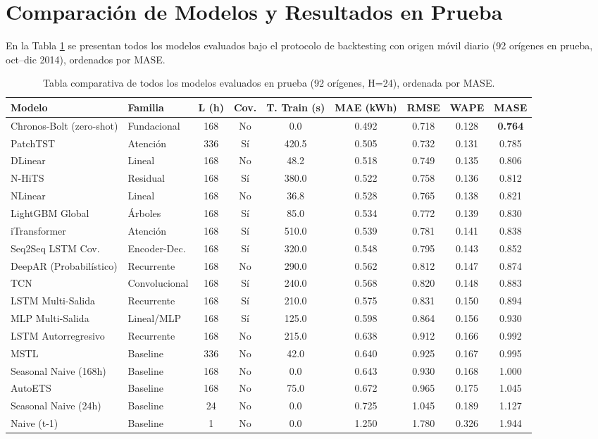 \documentclass[10pt,letterpaper]{article}
\begin{document}
\section{Comparación de Modelos y Resultados en Prueba}

En la Tabla \ref{tab:comparativa} se presentan todos los modelos evaluados bajo el protocolo de backtesting con origen móvil diario (92 orígenes en prueba, oct--dic 2014), ordenados por MASE.

\begin{table}[H]
\centering
\scriptsize
\caption{Tabla comparativa de todos los modelos evaluados en prueba (92 orígenes, H=24), ordenada por MASE.}
\label{tab:comparativa}
\begin{tabular}{llccccccc}
\toprule
\textbf{Modelo} & \textbf{Familia} & \textbf{L (h)} & \textbf{Cov.} & \textbf{T. Train (s)} & \textbf{MAE (kWh)} & \textbf{RMSE} & \textbf{WAPE} & \textbf{MASE} \\
\midrule
Chronos-Bolt (zero-shot) & Fundacional & 168 & No & 0.0 & 0.492 & 0.718 & 0.128 & \textbf{0.764} \\
PatchTST & Atención & 336 & Sí & 420.5 & 0.505 & 0.732 & 0.131 & 0.785 \\
DLinear & Lineal & 168 & No & 48.2 & 0.518 & 0.749 & 0.135 & 0.806 \\
N-HiTS & Residual & 168 & Sí & 380.0 & 0.522 & 0.758 & 0.136 & 0.812 \\
NLinear & Lineal & 168 & No & 36.8 & 0.528 & 0.765 & 0.138 & 0.821 \\
LightGBM Global & Árboles & 168 & Sí & 85.0 & 0.534 & 0.772 & 0.139 & 0.830 \\
iTransformer & Atención & 168 & Sí & 510.0 & 0.539 & 0.781 & 0.141 & 0.838 \\
Seq2Seq LSTM Cov. & Encoder-Dec. & 168 & Sí & 320.0 & 0.548 & 0.795 & 0.143 & 0.852 \\
DeepAR (Probabilístico) & Recurrente & 168 & No & 290.0 & 0.562 & 0.812 & 0.147 & 0.874 \\
TCN & Convolucional & 168 & Sí & 240.0 & 0.568 & 0.820 & 0.148 & 0.883 \\
LSTM Multi-Salida & Recurrente & 168 & Sí & 210.0 & 0.575 & 0.831 & 0.150 & 0.894 \\
MLP Multi-Salida & Lineal/MLP & 168 & Sí & 125.0 & 0.598 & 0.864 & 0.156 & 0.930 \\
LSTM Autorregresivo & Recurrente & 168 & No & 215.0 & 0.638 & 0.912 & 0.166 & 0.992 \\
MSTL & Baseline & 336 & No & 42.0 & 0.640 & 0.925 & 0.167 & 0.995 \\
Seasonal Naive (168h) & Baseline & 168 & No & 0.0 & 0.643 & 0.930 & 0.168 & 1.000 \\
AutoETS & Baseline & 168 & No & 75.0 & 0.672 & 0.965 & 0.175 & 1.045 \\
Seasonal Naive (24h) & Baseline & 24 & No & 0.0 & 0.725 & 1.045 & 0.189 & 1.127 \\
Naive (t-1) & Baseline & 1 & No & 0.0 & 1.250 & 1.780 & 0.326 & 1.944 \\
\bottomrule
\end{tabular}
\end{table}
\end{document}
